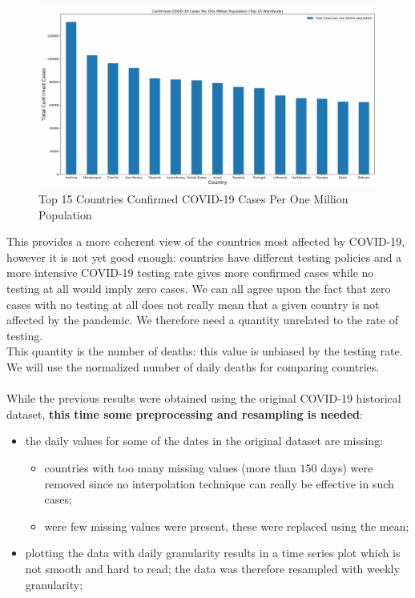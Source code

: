 \documentclass[11pt,a4paper]{article}
\begin{document}
\begin{figure}[H]
    \begin{center}
        \hspace*{-1.7cm}
        \includegraphics[scale=0.44]{img/total-cases-per-million.pdf}
    \end{center}
    \vspace*{-0.4cm}
    \caption{Top 15 Countries Confirmed COVID-19 Cases Per One Million Population}
\end{figure}
\noindent This provides a more coherent view of the countries most affected by
COVID-19, however it is not yet good enough: countries have different testing
policies and a more intensive COVID-19 testing rate gives more confirmed cases
while no testing at all would imply zero cases. We can all agree upon the fact
that zero cases with no testing at all does not really mean that a given country
is not affected by the pandemic. We therefore need a quantity unrelated to the
rate of testing.\\
This quantity is the number of deaths: this value is unbiased by the testing
rate. We will use the normalized number of daily deaths for comparing
countries.\\
\\
While the previous results were obtained using the original COVID-19 historical
dataset\cite{ourworldindata}, \textbf{this time some preprocessing and
resampling is needed}:
\begin{itemize}
    \item the daily values for some of the dates in the original dataset are missing:
    \begin{itemize}
        \item countries with too many missing values (more than $150$ days) were
        removed since no interpolation technique can really be effective in such
        cases;
        \item were few missing values were present, these were replaced using
        the mean;
    \end{itemize}
    \item plotting the data with daily granularity results in a time series plot
    which is not smooth and hard to read; the data was therefore resampled with
    weekly granularity;
\end{itemize}
\end{document}
